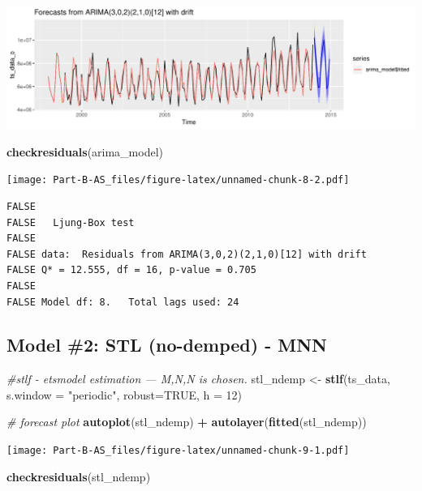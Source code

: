 \documentclass[openany]{book}
\newenvironment{Shaded}{\begin{snugshade}}{\end{snugshade}}
\newcommand{\KeywordTok}[1]{\textcolor[rgb]{0.13,0.29,0.53}{\textbf{#1}}}
\newcommand{\DataTypeTok}[1]{\textcolor[rgb]{0.13,0.29,0.53}{#1}}
\newcommand{\DecValTok}[1]{\textcolor[rgb]{0.00,0.00,0.81}{#1}}
\newcommand{\StringTok}[1]{\textcolor[rgb]{0.31,0.60,0.02}{#1}}
\newcommand{\CommentTok}[1]{\textcolor[rgb]{0.56,0.35,0.01}{\textit{#1}}}
\newcommand{\OtherTok}[1]{\textcolor[rgb]{0.56,0.35,0.01}{#1}}
\newcommand{\OperatorTok}[1]{\textcolor[rgb]{0.81,0.36,0.00}{\textbf{#1}}}
\newcommand{\NormalTok}[1]{#1}
\begin{document}
\includegraphics{Part-B-AS_files/figure-latex/unnamed-chunk-8-1.pdf}

\begin{Shaded}
\begin{Highlighting}[]
\KeywordTok{checkresiduals}\NormalTok{(arima_model)}
\end{Highlighting}
\end{Shaded}

\texttt{[image: Part-B-AS\_files/figure-latex/unnamed-chunk-8-2.pdf]}

\begin{verbatim}
FALSE 
FALSE   Ljung-Box test
FALSE 
FALSE data:  Residuals from ARIMA(3,0,2)(2,1,0)[12] with drift
FALSE Q* = 12.555, df = 16, p-value = 0.705
FALSE 
FALSE Model df: 8.   Total lags used: 24
\end{verbatim}

\subsection{Model \#2: STL (no-demped) -
MNN}\label{model-2-stl-no-demped---mnn}

\begin{Shaded}
\begin{Highlighting}[]
\CommentTok{#stlf - etsmodel estimation --- M,N,N is chosen.}
\NormalTok{stl_ndemp <-}\StringTok{ }\KeywordTok{stlf}\NormalTok{(ts_data, }\DataTypeTok{s.window =} \StringTok{"periodic"}\NormalTok{, }\DataTypeTok{robust=}\OtherTok{TRUE}\NormalTok{, }\DataTypeTok{h =} \DecValTok{12}\NormalTok{)}

\CommentTok{# forecast plot}
\KeywordTok{autoplot}\NormalTok{(stl_ndemp) }\OperatorTok{+}\StringTok{ }\KeywordTok{autolayer}\NormalTok{(}\KeywordTok{fitted}\NormalTok{(stl_ndemp))}
\end{Highlighting}
\end{Shaded}

\texttt{[image: Part-B-AS\_files/figure-latex/unnamed-chunk-9-1.pdf]}

\begin{Shaded}
\begin{Highlighting}[]
\KeywordTok{checkresiduals}\NormalTok{(stl_ndemp)}
\end{Highlighting}
\end{Shaded}
\end{document}
